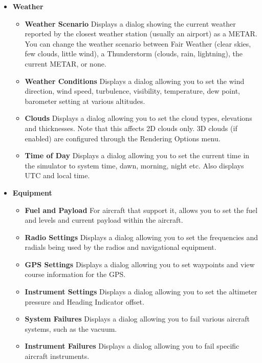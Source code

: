 \begin{itemize}
\item \textbf{Weather}
 \begin{itemize}
  \item \textbf{Weather Scenario} Displays a dialog showing the current weather
reported by the closest 
  weather station (usually an airport) as a METAR. You can change the weather
scenario between 
  Fair Weather (clear skies, few clouds, little wind), a Thunderstorm (clouds,
rain, lightning), 
  the current METAR, or none.
  \item \textbf{Weather Conditions}  Displays a dialog allowing you to set the
wind direction, wind speed, 
  turbulence, visibility, temperature, dew point, barometer setting at various
altitudes. 
  \item \textbf{Clouds}  Displays a dialog allowing you to set the cloud types,
elevations and thicknesses. 
  Note that this affects 2D clouds only. 3D clouds (if enabled) are configured
through the Rendering Options menu.
  \item \textbf{Time of Day}  Displays a dialog allowing you to set the current
time in the simulator to 
  system time, dawn, morning, night etc. Also displays UTC and local time.
 \end{itemize}
 
\item \textbf{Equipment} 
 \begin{itemize}
  \item \textbf{Fuel and Payload}  For aircraft that support it, allows you to
set the fuel and levels 
  and current payload within the aircraft.
  \item \textbf{Radio Settings}  Displays a dialog allowing you to set the
frequencies and radials being 
  used by the radios and navigational equipment.
  \item \textbf{GPS Settings}  Displays a dialog allowing you to set waypoints
and view course information for the GPS.
  \item \textbf{Instrument Settings}  Displays a dialog allowing you to set the
altimeter pressure and Heading Indicator offset.   
  \item \textbf{System Failures} Displays a dialog allowing you to fail various
aircraft systems, such as the vacuum.
  \item \textbf{Instrument Failures}  Displays a dialog allowing you to fail
specific aircraft instruments.
 \end{itemize}


\end{itemize}
